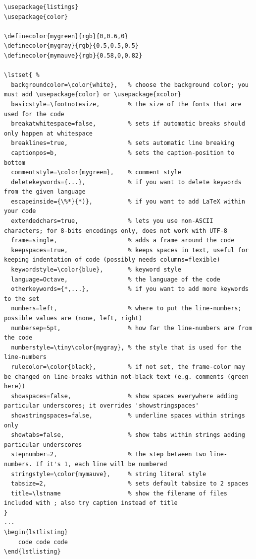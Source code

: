\documentclass{article}
\begin{document}
\begin{verbatim}
\usepackage{listings}
\usepackage{color}

\definecolor{mygreen}{rgb}{0,0.6,0}
\definecolor{mygray}{rgb}{0.5,0.5,0.5}
\definecolor{mymauve}{rgb}{0.58,0,0.82}

\lstset{ %
  backgroundcolor=\color{white},   % choose the background color; you must add \usepackage{color} or \usepackage{xcolor}
  basicstyle=\footnotesize,        % the size of the fonts that are used for the code
  breakatwhitespace=false,         % sets if automatic breaks should only happen at whitespace
  breaklines=true,                 % sets automatic line breaking
  captionpos=b,                    % sets the caption-position to bottom
  commentstyle=\color{mygreen},    % comment style
  deletekeywords={...},            % if you want to delete keywords from the given language
  escapeinside={\%*}{*)},          % if you want to add LaTeX within your code
  extendedchars=true,              % lets you use non-ASCII characters; for 8-bits encodings only, does not work with UTF-8
  frame=single,                    % adds a frame around the code
  keepspaces=true,                 % keeps spaces in text, useful for keeping indentation of code (possibly needs columns=flexible)
  keywordstyle=\color{blue},       % keyword style
  language=Octave,                 % the language of the code
  otherkeywords={*,...},           % if you want to add more keywords to the set
  numbers=left,                    % where to put the line-numbers; possible values are (none, left, right)
  numbersep=5pt,                   % how far the line-numbers are from the code
  numberstyle=\tiny\color{mygray}, % the style that is used for the line-numbers
  rulecolor=\color{black},         % if not set, the frame-color may be changed on line-breaks within not-black text (e.g. comments (green here))
  showspaces=false,                % show spaces everywhere adding particular underscores; it overrides 'showstringspaces'
  showstringspaces=false,          % underline spaces within strings only
  showtabs=false,                  % show tabs within strings adding particular underscores
  stepnumber=2,                    % the step between two line-numbers. If it's 1, each line will be numbered
  stringstyle=\color{mymauve},     % string literal style
  tabsize=2,                       % sets default tabsize to 2 spaces
  title=\lstname                   % show the filename of files included with ; also try caption instead of title
}
...
\begin{lstlisting}
    code code code
\end{lstlisting}
\end{verbatim}
\end{document}
